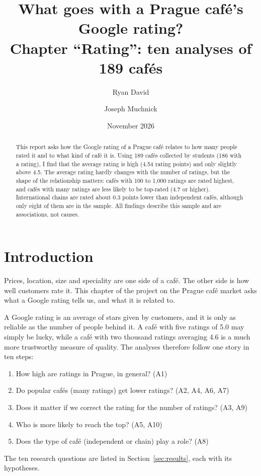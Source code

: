 \documentclass[11pt,a4paper]{article}
\title{What goes with a Prague caf\'e's Google rating?\\[0.3em]
\large Chapter ``Rating'': ten analyses of 189 caf\'es}
\author{Ryan David \and Joseph Muchnick}
\date{November 2026}
\begin{document}
\maketitle

\begin{abstract}
\noindent
This report asks how the Google rating of a Prague caf\'e relates to how many people rated it and to what kind of caf\'e it is.
Using 189 caf\'es collected by students (186 with a rating), I find that the average rating is high (4.54 rating points) and only slightly above 4.5.
The average rating hardly changes with the number of ratings, but the shape of the relationship matters: caf\'es with 100 to 1,000 ratings are rated highest, and caf\'es with many ratings are less likely to be top-rated (4.7 or higher).
International chains are rated about 0.3 points lower than independent caf\'es, although only eight of them are in the sample.
All findings describe this sample and are associations, not causes.
\end{abstract}

\tableofcontents
\newpage

\section{Introduction}
Prices, location, size and speciality are one side of a caf\'e. The other side is how well customers rate it. This chapter of the project on the Prague caf\'e market asks what a Google rating tells us, and what it is related to.

A Google rating is an average of stars given by customers, and it is only as reliable as the number of people behind it. A caf\'e with five ratings of 5.0 may simply be lucky, while a caf\'e with two thousand ratings averaging 4.6 is a much more trustworthy measure of quality. The analyses therefore follow one story in ten steps:
\begin{enumerate}
  \item How high are ratings in Prague, in general? (A1)
  \item Do popular caf\'es (many ratings) get lower ratings? (A2, A4, A6, A7)
  \item Does it matter if we correct the rating for the number of ratings? (A3, A9)
  \item Who is more likely to reach the top? (A5, A10)
  \item Does the type of caf\'e (independent or chain) play a role? (A8)
\end{enumerate}
The ten research questions are listed in Section~\ref{sec:results}, each with its hypotheses.
\end{document}
